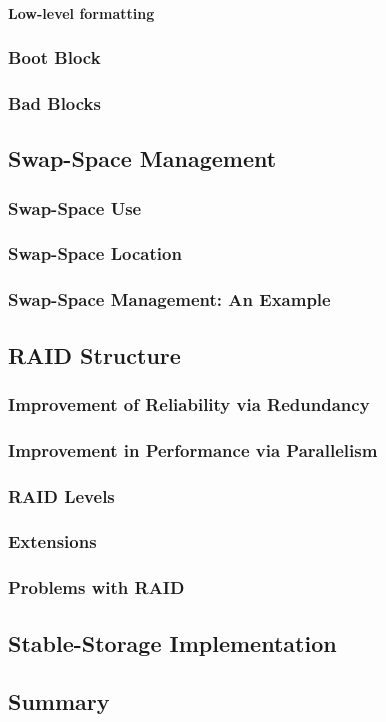 \paragraph{Low-level formatting}
\subsubsection{Boot Block}
\subsubsection{Bad Blocks}
\subsection{Swap-Space Management}
\subsubsection{Swap-Space Use}
\subsubsection{Swap-Space Location}
\subsubsection{Swap-Space Management: An Example}
\subsection{RAID Structure}
\subsubsection{Improvement of Reliability via Redundancy}
\subsubsection{Improvement in Performance via Parallelism}
\subsubsection{RAID Levels}
\subsubsection{Extensions}
\subsubsection{Problems with RAID}
\subsection{Stable-Storage Implementation}
\subsection{Summary}

